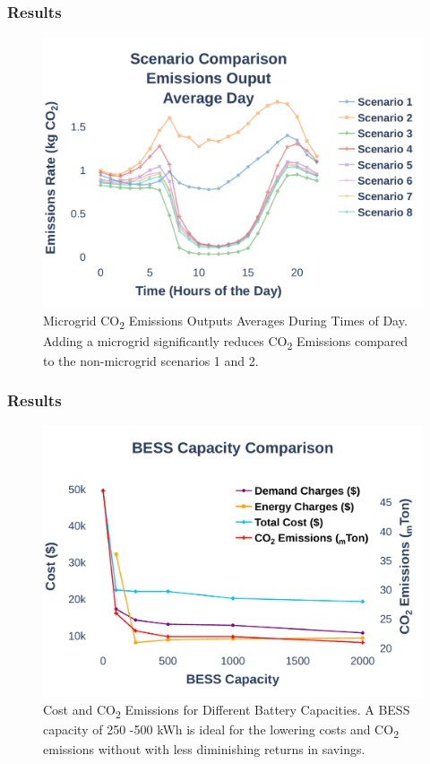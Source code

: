 \documentclass[aspectratio=169, 8 pt]{beamer}
\begin{document}
		\begin{frame}
			\frametitle{Results}
			\begin{figure}
				\centering
				\includegraphics[width=0.7\linewidth]{Fig/emissions_scenario_comparison_run_3_large_font}
				\caption{Microgrid CO\textsubscript{2} Emissions Outputs Averages During Times of Day. Adding a microgrid significantly reduces CO\textsubscript{2} Emissions compared to the non-microgrid scenarios 1 and 2.}
				\label{fig:emissionsscenariocomparison}
			\end{figure}
		\end{frame}
	
		\begin{frame}
			\frametitle{Results}
			\begin{figure}
				\centering
				\includegraphics[width=0.7\linewidth]{Fig/bess_capacity_comparison_large_font}
				\caption{Cost and CO\textsubscript{2} Emissions for Different Battery Capacities. A BESS capacity of 250 -500 kWh is ideal for the lowering costs and CO\textsubscript{2} emissions without with less diminishing returns in savings. }
				\label{fig:besscapacitycomparison}
			\end{figure}
		\end{frame}
		
\end{document}
